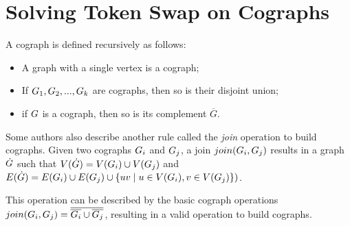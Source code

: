 \documentclass[msc,english,table,xcdraw]{ppgccufmg}
\begin{document}
\chapter{Solving Token Swap on Cographs}
\label{chp:cographs}



A cograph is defined recursively as follows:

\begin{itemize}
    \item A graph with a single vertex is a cograph;
    \item If $G_{1}, G_{2}, ... ,G_{k}$ are cographs, then 
    so is their disjoint union;
    \item if $G$ is a cograph, then so is its complement $\overline{G}$.
\end{itemize}

Some authors also describe another rule called the \textit{join} 
operation to build cographs.
Given two cographs $G_{i}$ and $G_{j}$, a join $join(G_{i},
G_{j})$ results in a graph $\dot{G}$ such that $V(\dot{G}) = V(G_{i}) \cup V(G_{j})$ and 
$E(\dot{G}) = E(G_{i}) \cup E(G_{j})
\cup \{uv \mid u \in V(G_{i}), v \in V(G_{j}) \})$.

This operation can be described by the basic cograph operations $join(G_{i},
G_{j}) = \overline{\overline{G_{i}} \cup \overline{G_{j}}}$, resulting 
in a valid operation to build cographs.

\end{document}
